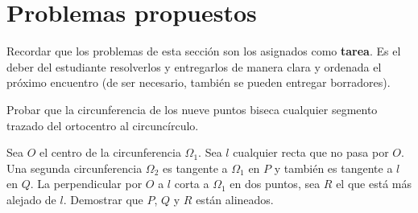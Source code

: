 \section{Problemas propuestos}

Recordar que los problemas de esta sección son los asignados como \textbf{tarea}.
Es el deber del estudiante resolverlos y entregarlos de manera clara y ordenada el próximo encuentro
(de ser necesario, también se pueden entregar borradores).

\begin{section-exercise}
    Probar que la circunferencia de los nueve puntos biseca cualquier segmento trazado del ortocentro al circuncírculo.
\end{section-exercise}

\begin{section-problem}
    Sea $O$ el centro de la circunferencia $\Omega_1$.
    Sea $l$ cualquier recta que no pasa por $O$.
    Una segunda circunferencia $\Omega_2$ es tangente a $\Omega_1$ en $P$ y también es tangente a $l$ en $Q$.
    La perpendicular por $O$ a $l$ corta a $\Omega_1$ en dos puntos, sea $R$ el que está más alejado de $l$.
    Demostrar que $P$, $Q$ y $R$ están alineados.
\end{section-problem}